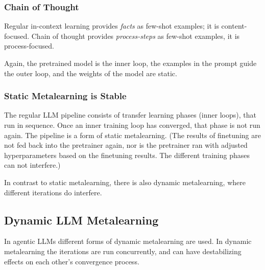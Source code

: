 \subsubsection{Chain of Thought}
Regular in-context learning provides {\em facts} as few-shot examples; it is content-focused. 
Chain of thought provides {\em process-steps} as few-shot examples, it is process-focused. 


Again, the pretrained model is the inner loop, the examples in the prompt guide the outer loop, and the weights of the model are static. 


\subsubsection{Static Metalearning is Stable}
The regular LLM pipeline consists  of  transfer learning phases (inner loops), that run  in sequence. Once an inner training loop has converged, that phase is not run again. The pipeline is a form of static metalearning. %
(The results of finetuning are not fed back into the pretrainer again, nor is the pretrainer ran with adjusted hyperparameters based on the finetuning results. The different training phases can not interfere.) 

In contrast to static metalearning, there is also dynamic metalearning, where different iterations do interfere.


\subsection{Dynamic LLM Metalearning}
In agentic LLMs different forms of dynamic metalearning are used. In dynamic metalearning the iterations are run concurrently, and can have destabilizing effects on each other's convergence process. 

